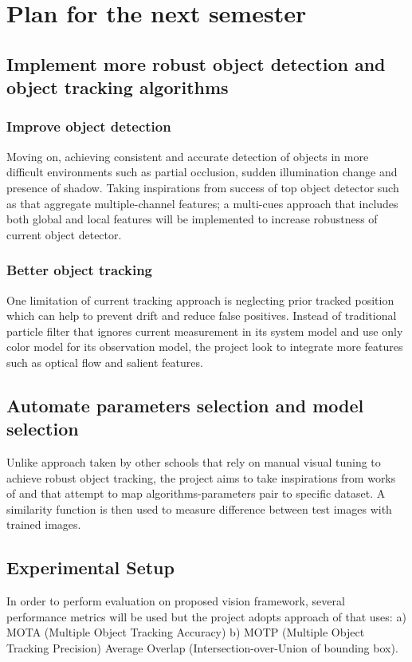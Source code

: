 \chapter{Plan for the next semester}
\section{Implement more robust object detection and object tracking algorithms}

\subsection{Improve object detection}
Moving on, achieving consistent and accurate detection of objects in more difficult environments such as partial occlusion, sudden illumination change and presence of shadow. Taking inspirations from success of top object detector such as  that aggregate multiple-channel features; a multi-cues approach that includes both global and local features will be implemented to increase robustness of current object detector.

\subsection{Better object tracking}
One limitation of current tracking approach is neglecting prior tracked position which can help to prevent drift and reduce false positives. Instead of traditional particle filter that ignores current measurement in its system model and use only color model for its observation model, the project look to integrate more features such as optical flow and salient features. 

\section{Automate parameters selection and model selection}
Unlike approach taken by other schools that rely on manual visual tuning to achieve robust object tracking, the project aims to take inspirations from works of \cite{Zhang2016} and \cite{collins2005online} that attempt to map algorithms-parameters pair to specific dataset. A similarity function is then used to measure difference between test images with trained images.

\section{Experimental Setup}
In order to perform evaluation on proposed vision framework, several performance metrics will be used but the project adopts approach of  that uses: a) MOTA (Multiple Object Tracking Accuracy) b) MOTP (Multiple Object Tracking Precision) Average Overlap (Intersection-over-Union of bounding box). 

